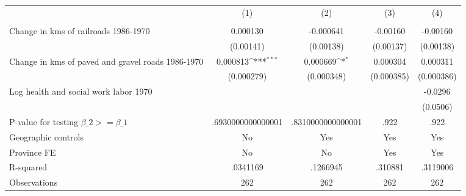 {
\def\sym#1{\ifmmode^{#1}\else\(^{#1}\)\fi}
\begin{tabular}{l*{4}{c}}
\hline\hline
                &\multicolumn{1}{c}{(1)}&\multicolumn{1}{c}{(2)}&\multicolumn{1}{c}{(3)}&\multicolumn{1}{c}{(4)}\\
                &\multicolumn{1}{c}{}&\multicolumn{1}{c}{}&\multicolumn{1}{c}{}&\multicolumn{1}{c}{}\\
\hline
Change in kms of railroads 1986-1970& 0.000130         &-0.000641         & -0.00160         & -0.00160         \\
                &(0.00141)         &(0.00138)         &(0.00137)         &(0.00138)         \\
[1em]
Change in kms of paved and gravel roads 1986-1970& 0.000813\sym{***}& 0.000669\sym{*}  & 0.000304         & 0.000311         \\
                &(0.000279)         &(0.000348)         &(0.000385)         &(0.000386)         \\
[1em]
Log health and social work labor 1970&                  &                  &                  &  -0.0296         \\
                &                  &                  &                  & (0.0506)         \\
\hline
P-value for testing $\beta\_{2} >= \beta\_{1}$&.6930000000000001         &.8310000000000001         &     .922         &     .922         \\
Geographic controls&       No         &      Yes         &      Yes         &      Yes         \\
Province FE     &       No         &       No         &      Yes         &      Yes         \\
R-squared       & .0341169         & .1266945         &  .310881         & .3119006         \\
Observations    &      262         &      262         &      262         &      262         \\
\hline\hline
\end{tabular}
}
